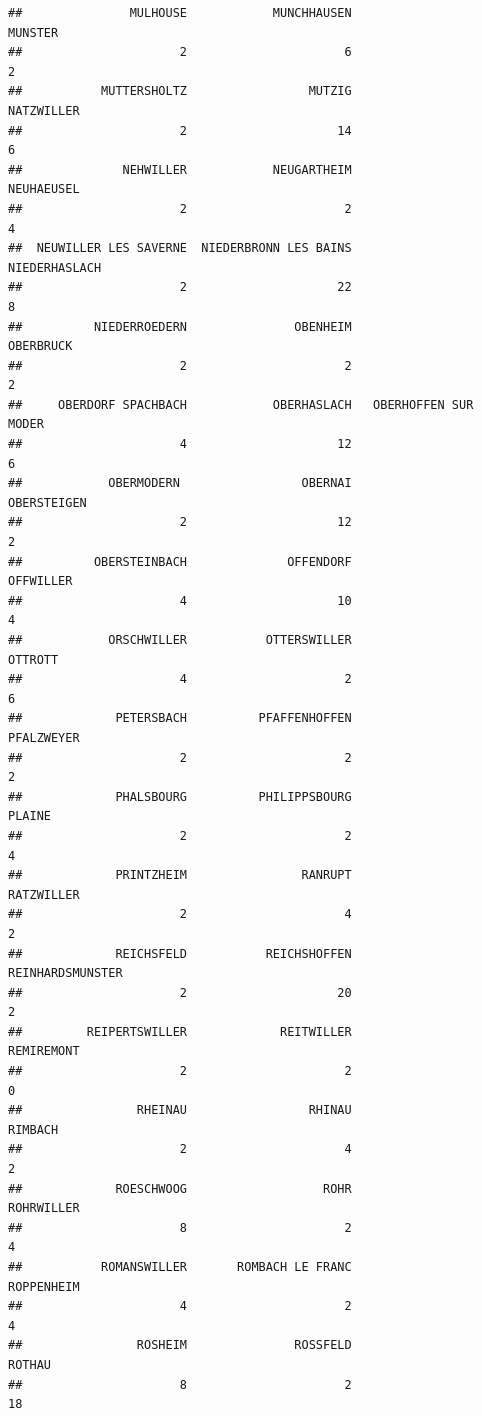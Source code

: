\documentclass{article}\usepackage[]{graphicx}\usepackage[]{color}
\makeatletter
\newenvironment{kframe}{%
 \def\at@end@of@kframe{}%
 \ifinner\ifhmode%
  \def\at@end@of@kframe{\end{minipage}}%
  \begin{minipage}{\columnwidth}%
 \fi\fi%
 \def\FrameCommand##1{\hskip\@totalleftmargin \hskip-\fboxsep
 \colorbox{shadecolor}{##1}\hskip-\fboxsep
     \hskip-\linewidth \hskip-\@totalleftmargin \hskip\columnwidth}%
 \MakeFramed {\advance\hsize-\width
   \@totalleftmargin\z@ \linewidth\hsize
   \@setminipage}}%
 {\par\unskip\endMakeFramed%
 \at@end@of@kframe}
\newenvironment{knitrout}{}{} %
\makeatother
\begin{document}
\begin{knitrout}
\begin{kframe}
\begin{verbatim}
##               MULHOUSE            MUNCHHAUSEN                MUNSTER 
##                      2                      6                      2 
##           MUTTERSHOLTZ                 MUTZIG             NATZWILLER 
##                      2                     14                      6 
##              NEHWILLER            NEUGARTHEIM             NEUHAEUSEL 
##                      2                      2                      4 
##  NEUWILLER LES SAVERNE  NIEDERBRONN LES BAINS          NIEDERHASLACH 
##                      2                     22                      8 
##          NIEDERROEDERN               OBENHEIM              OBERBRUCK 
##                      2                      2                      2 
##     OBERDORF SPACHBACH            OBERHASLACH   OBERHOFFEN SUR MODER 
##                      4                     12                      6 
##            OBERMODERN                 OBERNAI            OBERSTEIGEN 
##                      2                     12                      2 
##          OBERSTEINBACH              OFFENDORF              OFFWILLER 
##                      4                     10                      4 
##            ORSCHWILLER           OTTERSWILLER                OTTROTT 
##                      4                      2                      6 
##             PETERSBACH          PFAFFENHOFFEN             PFALZWEYER 
##                      2                      2                      2 
##             PHALSBOURG          PHILIPPSBOURG                 PLAINE 
##                      2                      2                      4 
##             PRINTZHEIM                RANRUPT             RATZWILLER 
##                      2                      4                      2 
##             REICHSFELD           REICHSHOFFEN       REINHARDSMUNSTER 
##                      2                     20                      2 
##         REIPERTSWILLER             REITWILLER             REMIREMONT 
##                      2                      2                      0 
##                RHEINAU                 RHINAU                RIMBACH 
##                      2                      4                      2 
##             ROESCHWOOG                   ROHR             ROHRWILLER 
##                      8                      2                      4 
##           ROMANSWILLER       ROMBACH LE FRANC             ROPPENHEIM 
##                      4                      2                      4 
##                ROSHEIM               ROSSFELD                 ROTHAU 
##                      8                      2                     18 

\end{verbatim}
\end{kframe}
\end{knitrout}
\end{document}
